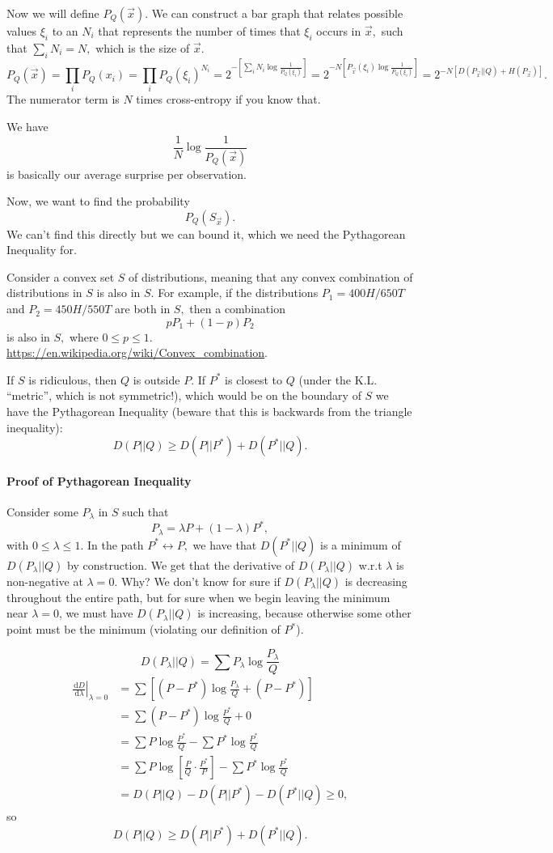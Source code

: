 \documentclass[12pt]{article}
\theoremstyle{remark}
\newcommand{\diffn}[1]{\,\mathrm{d}{#1}}
\newcommand{\fdiffn}[2]{\frac{\diffn{#1}}{\diffn{#2}}}
\begin{document}
Now we will define $P_Q(\vec{x}).$ We can construct a bar graph that relates possible values $\xi_i$ to an $N_i$ that represents the number of times that $\xi_i$ occurs in $\vec{x},$ such that $\sum_i N_i=N,$ which is the size of $\vec{x}.$
\[P_Q(\vec{x})=\prod_i P_Q(x_i)=\prod_i P_Q(\xi_i)^{N_i}=2^{-\left[\sum_i N_i\log\frac{1}{P_Q(\xi_i)}\right]}=2^{-N\left[P_{\vec{x}}(\xi_i)\log\frac{1}{P_Q(\xi_i)}\right]}=2^{-N[D(P_{\vec{x}}||Q)+H(P_{\vec{x}})]}.\] The numerator term is $N$ times cross-entropy if you know that.

We have
\[\frac{1}{N}\log \frac{1}{P_Q(\vec{x})}\] is basically our average surprise per observation.

Now, we want to find the probability 
\[P_Q(S_{\vec{x}}).\] We can't find this directly but we can bound it, which we need the Pythagorean Inequality for. 

Consider a convex set $S$ of distributions, meaning that any convex combination of distributions in $S$ is also in $S.$ For example, if the distributions $P_1=400H/650T$ and $P_2=450H/550T$ are both in $S,$ then a combination \[pP_1+(1-p)P_2\] is also in $S,$ where $0\le p\le 1.$ \url{https://en.wikipedia.org/wiki/Convex_combination}.

If $S$ is ridiculous, then $Q$ is outside $P.$ If $P^\ast$ is closest to $Q$ (under the K.L. ``metric'', which is not symmetric!), which would be on the boundary of $S$ we have the Pythagorean Inequality (beware that this is backwards from the triangle inequality):
\[D(P||Q)\ge D(P||P^\ast)+D(P^\ast||Q).\]
\paragraph{Proof of Pythagorean Inequality}
Consider some $P_\lambda$ in $S$ such that
\[P_\lambda=\lambda P+(1-\lambda)P^\ast,\] with $0\le\lambda\le 1.$ In the path $P^\ast\leftrightarrow P,$ we have that $D(P^\ast||Q)$ is a minimum of $D(P_\lambda||Q)$ by construction. We get that the derivative of $D(P_\lambda||Q)$ w.r.t $\lambda$ is non-negative at $\lambda=0$. Why? We don't know for sure if $D(P_\lambda||Q)$ is decreasing throughout the entire path, but for sure when we begin leaving the minimum near $\lambda = 0$, we must have $D(P_\lambda||Q)$ is increasing, because otherwise some other point must be the minimum (violating our definition of $P^\ast$).

\[D(P_{\lambda}||Q)=\sum P_{\lambda}\log\frac{P_{\lambda}}{Q}\]
\begin{align*}\left.\fdiffn{D}{\lambda} \right|_{\lambda=0}&=\sum\left[(P-P^\ast)\log\frac{P_\lambda}{Q}+(P-P^\ast)\right]\\&=\sum(P-P^\ast)\log\frac{P^\ast}{Q}+0\\&=\sum P\log \frac{P^\ast}{Q}-\sum P^\ast \log \frac{P^\ast}{Q}\\&=\sum P\log\left[\frac{P}{Q}\cdot\frac{P^\ast}{P}\right]-\sum P^\ast\log\frac{P^\ast}{Q}\\&=D(P||Q)-D(P||P^\ast)-D(P^\ast||Q)\ge 0,\end{align*}
so
\[D(P||Q)\ge D(P||P^\ast)+D(P^\ast||Q).\]
\end{document}
